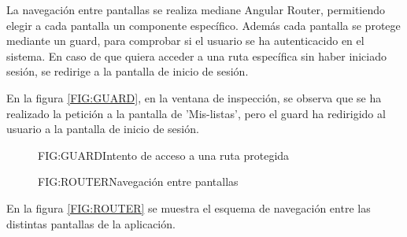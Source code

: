 La navegación entre pantallas se realiza mediane Angular Router, permitiendo elegir a cada pantalla un componente específico. Además 
cada pantalla se protege mediante un guard, para comprobar si el usuario se ha autenticacido en el sistema. En caso de que quiera 
acceder a una ruta específica sin haber iniciado sesión, se redirige a la pantalla de inicio de sesión.

En la figura \ref{FIG:GUARD}, en la ventana de inspección, se observa que se ha realizado la petición a la pantalla de 'Mis-listas', pero el guard 
ha redirigido al usuario a la pantalla de inicio de sesión. 

\begin{figure}[Intento de acceso a una ruta protegida]{FIG:GUARD}{Intento de acceso a una ruta protegida}
\end{figure}

\begin{figure}[Navegación entre pantallas]{FIG:ROUTER}{Navegación entre pantallas}
\end{figure}

En la figura \ref{FIG:ROUTER} se muestra el esquema de navegación entre las distintas pantallas de la aplicación.

